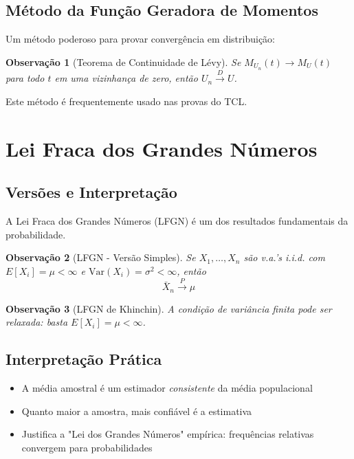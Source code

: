 \documentclass[12pt,a4paper]{article}
\theoremstyle{definition}
\theoremstyle{plain}
\newtheorem{observacao}{Observação}[section]
\begin{document}
\subsection{Método da Função Geradora de Momentos}

Um método poderoso para provar convergência em distribuição:

\begin{observacao}[Teorema de Continuidade de Lévy]
Se $M_{U_n}(t) \to M_U(t)$ para todo $t$ em uma vizinhança de zero, então $U_n \xrightarrow{D} U$.
\end{observacao}

Este método é frequentemente usado nas provas do TCL.

\section{Lei Fraca dos Grandes Números}

\subsection{Versões e Interpretação}

A Lei Fraca dos Grandes Números (LFGN) é um dos resultados fundamentais da probabilidade.

\begin{observacao}[LFGN - Versão Simples]
Se $X_1, \ldots, X_n$ são v.a.'s i.i.d. com $E[X_i] = \mu < \infty$ e $\text{Var}(X_i) = \sigma^2 < \infty$, então
\[
\bar{X}_n \xrightarrow{P} \mu
\]
\end{observacao}

\begin{observacao}[LFGN de Khinchin]
A condição de variância finita pode ser relaxada: basta $E[X_i] = \mu < \infty$.
\end{observacao}

\subsection{Interpretação Prática}

\begin{itemize}
    \item A média amostral é um estimador \emph{consistente} da média populacional
    \item Quanto maior a amostra, mais confiável é a estimativa
    \item Justifica a "Lei dos Grandes Números" empírica: frequências relativas convergem para probabilidades
\end{itemize}
\end{document}
